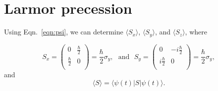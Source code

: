 \section{Larmor precession\label{sec:Larmor}}

Using Eqn.~\ref{eqn:psi}, we can determine
$\langle S_{x} \rangle$, $\langle S_{y} \rangle$, and
$\langle S_{z} \rangle$, where

\[ S_{x} = \left( \begin{array}{cc}
                    0 & \frac{\hbar}{2}  \\
                    \frac{\hbar}{2} & 0 \\
\end{array} \right) = \frac{\hbar}{2} \sigma_{y} ,\,\,\,\, \textrm{and} \,\,\,\, S_{y} = \left( \begin{array}{cc}
 0 & -i\frac{\hbar}{2}  \\
i\frac{\hbar}{2} & 0 \\
\end{array} \right) = \frac{\hbar}{2} \sigma_{y} ,\]
%
and
%
\begin{equation*}
\langle S \rangle = \langle \psi(t) | S | \psi(t) \rangle .
\end{equation*}

